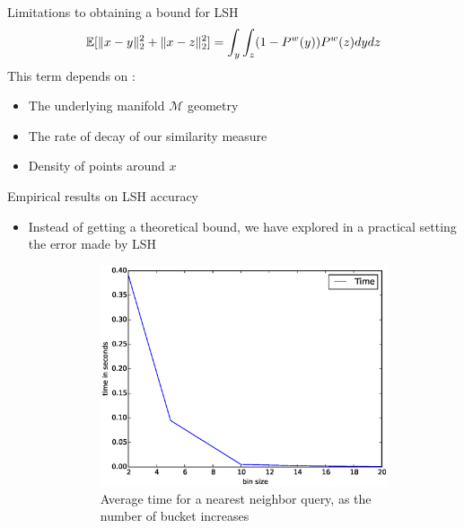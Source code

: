 \documentclass[11pt)]{beamer}
\begin{document}
\begin{frame}{Limitations to obtaining a bound for LSH}
$$\mathbb{E}[\Arrowvert x-y\Arrowvert_2^2 + \Arrowvert x-z\Arrowvert_2^2] = \int_y \int_z (1-P^w(y))P^w(z)dydz$$
This term depends on :
\begin{itemize}
 \item The underlying manifold $\mathcal{M}$ geometry
 \item The rate of decay of our similarity measure
 \item Density of points around $x$
\end{itemize}
\end{frame}

\begin{frame}{Empirical results on LSH accuracy}
\begin{itemize}
\item Instead of getting a theoretical bound, we have explored in a practical setting the error made by LSH
\begin{figure}[!h]
 \begin{subfigure}{0.27\textwidth}
   \includegraphics[width=\textwidth]{time_binsize.eps}
   \caption{Average time for a nearest neighbor query, as the number of bucket increases}
 \end{subfigure}\hfill
 \begin{subfigure}{0.27\textwidth}

\end{subfigure}
\end{figure}
\end{itemize}
\end{frame}
\end{document}
